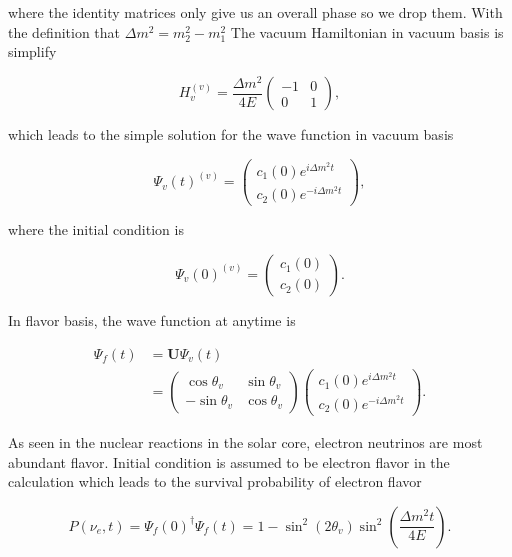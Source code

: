 \documentclass[%
 aip,
 jmp,%
 amsmath,amssymb,
 reprint,%
]{revtex4-1}
\begin{document}
where the identity matrices only give us an overall phase so we drop them. With the definition that $\Delta m^2 = m_2^2 - m_1^2$ The vacuum Hamiltonian in vacuum basis is simplify

\begin{equation}
H_v^{(v)} =  \frac{\Delta m^2}{4E} \begin{pmatrix}
-1 & 0 \\
0 & 1
\end{pmatrix},
\end{equation}

which leads to the simple solution for the wave function in vacuum basis

\begin{equation}
\Psi_v(t)^{(v)} = \begin{pmatrix}
c_1(0) e^{i\Delta m^2 t } \\
c_2(0) e^{ -i\Delta m^2 t } 
\end{pmatrix},
\end{equation}

where the initial condition is

\begin{equation}
\Psi_v(0)^{(v)} = \begin{pmatrix}
c_1(0) \\
c_2(0) 
\end{pmatrix}.
\end{equation}

In flavor basis, the wave function at anytime is

\begin{align}
\Psi_f(t) &= \mathbf{U}\Psi_v(t) \\
& = \begin{pmatrix} \cos\theta_v & \sin \theta_v \\ -\sin \theta_v & \cos \theta_v \end{pmatrix} \begin{pmatrix} c_1(0) e^{i\Delta m^2 t } \\
c_2(0) e^{ -i\Delta m^2 t }    \end{pmatrix} .
\end{align}

As seen in the nuclear reactions in the solar core, electron neutrinos are most abundant flavor. Initial condition is assumed to be electron flavor in the calculation which leads to the survival probability of electron flavor

\begin{equation}
P(\nu_e,t) = \Psi_f(0)^\dagger \Psi_f(t) = 1-\sin^2(2\theta_v)\sin^2\left( \frac{\Delta m^2 t}{4E} \right).
\end{equation}
\end{document}
